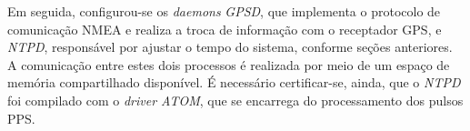 \vspace{12pt}

Em seguida, configurou-se os \textit{daemons} \textit{GPSD}, que implementa o
protocolo de comunicação NMEA e realiza a troca de informação com o receptador
GPS, e \textit{NTPD}, responsável por ajustar o tempo do sistema, conforme
seções anteriores. A comunicação entre estes dois processos é realizada por meio de um
espaço de memória compartilhado disponível. É necessário certificar-se, ainda,
que o \textit{NTPD} foi compilado com o \textit{driver ATOM}, que se encarrega
do processamento dos pulsos PPS.

% 
%  
% 
% 
% 
% 
%  
% 
% 
% 
